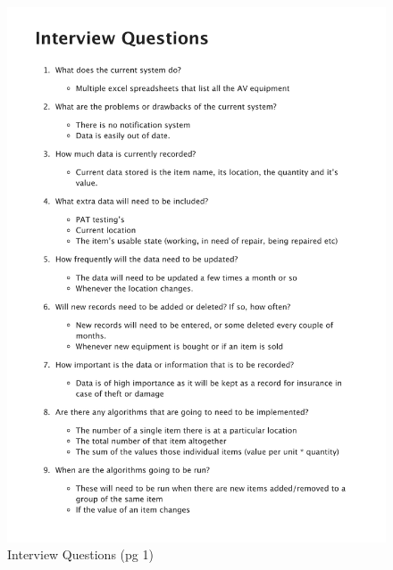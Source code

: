 \begin{figure}[H]
    
    \includegraphics[page=1,width=\textwidth]{./Analysis/Interview/interview_questions.pdf}
    \caption{Interview Questions (pg 1)} \label{fig: Interview Questions}
\end{figure}		
		
